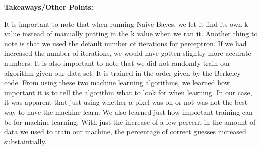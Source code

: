 \documentclass[11pt]{article} %
\begin{document}
\begin{center}
\textbf{Takeaways/Other Points:}
\end{center}
\par
It is important to note that when running Naive Bayes, we let it find its own k value instead of manually putting in the k value when we ran it. Another thing to note is that we used the default number of iterations for perceptron. If we had increased the number of iterations, we would have gotten slightly more accurate numbers. It is also important to note that we did not randomly train our algorithm given our data set. It is trained in the order given by the Berkeley code. From using these two machine learning algorithms, we learned how important it is to tell the algorithm what to look for when learning. In our case, it was apparent that just using whether a pixel was on or not was not the best way to have the machine learn. We also learned just how important training can be for machine learning. With just the increase of a few percent in the amount of data we used to train our machine, the percentage of correct guesses increased substaintially.
\end{document}

